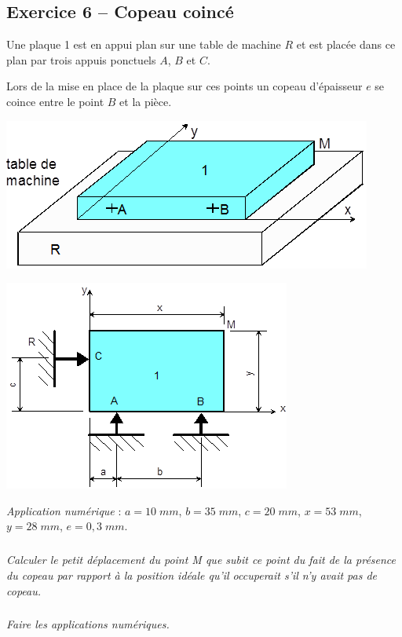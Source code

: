 \documentclass[10pt,oneside]{article}
\begin{document}
\subsection*{Exercice 6 -- Copeau coincé}
\setcounter{subparagraph}{0}
Une plaque 1 est en appui plan sur une table de machine $R$ et est placée dans ce plan par trois appuis ponctuels $A$, $B$ et $C$.

 Lors de la mise en place de la plaque sur ces points un copeau d'épaisseur $e$ se coince entre le point $B$ et la pièce.

\begin{minipage}[c]{.47\linewidth}
\begin{center}
\includegraphics[width=.9\textwidth]{png/fig1}
\end{center}
\end{minipage} \hfill
\begin{minipage}[c]{.47\linewidth}
\begin{center}
\includegraphics[width=.9\textwidth]{png/fig2}
\end{center}
\end{minipage}

\vspace{.25cm}

\textit{Application numérique} :
$a=10\; mm$, $b=35\; mm$, $c= 20\; mm$, $x=53\; mm$, $y=28\; mm$, $e=0,3\; mm$.

\subparagraph{}
\textit{Calculer le petit déplacement du point M que subit ce point du fait de la présence du copeau par rapport à la position idéale qu’il occuperait s’il n’y avait pas de copeau.}

\subparagraph{}
\textit{Faire les applications numériques.}
\end{document}
